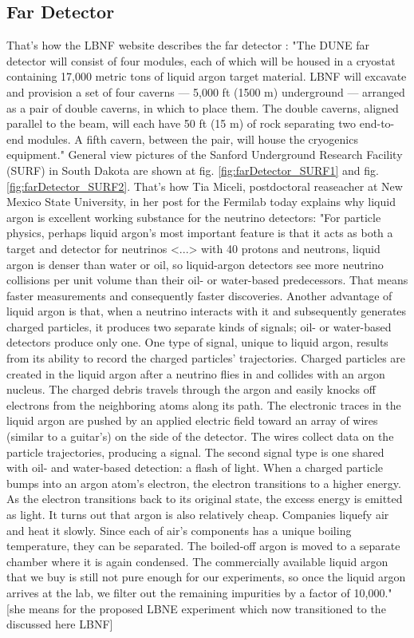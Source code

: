 \subsection{Far Detector}

That's how the LBNF website describes the far detector \cite{ref_LBNFweb}: "The DUNE far detector will consist of four modules, each of which will be housed in a cryostat containing 17,000 metric tons of liquid argon target material. LBNF will excavate and provision a set of four caverns — 5,000 ft (1500 m) underground — arranged as a pair of double caverns, in which to place them. The double caverns, aligned parallel to the beam, will each have 50 ft (15 m) of rock separating two end-to-end modules. A fifth cavern, between the pair, will house the cryogenics equipment." General view pictures of the Sanford Underground Research Facility (SURF) in South Dakota are shown at fig. \ref{fig:farDetector_SURF1} and fig. \ref{fig:farDetector_SURF2}.
That's how Tia Miceli, postdoctoral reaseacher at New Mexico State University, in her post for the Fermilab today \cite{ref_aboutLAr} explains why liquid argon is excellent working substance for the neutrino detectors:
"For particle physics, perhaps liquid argon's most important feature is that it acts as both a target and detector for neutrinos <...> with 40 protons and neutrons, liquid argon is denser than water or oil, so liquid-argon detectors see more neutrino collisions per unit volume than their oil- or water-based predecessors. That means faster measurements and consequently faster discoveries. Another advantage of liquid argon is that, when a neutrino interacts with it and subsequently generates charged particles, it produces two separate kinds of signals; oil- or water-based detectors produce only one. One type of signal, unique to liquid argon, results from its ability to record the charged particles' trajectories. Charged particles are created in the liquid argon after a neutrino flies in and collides with an argon nucleus. The charged debris travels through the argon and easily knocks off electrons from the neighboring atoms along its path. The electronic traces in the liquid argon are pushed by an applied electric field toward an array of wires (similar to a guitar's) on the side of the detector. The wires collect data on the particle trajectories, producing a signal. The second signal type is one shared with oil- and water-based detection: a flash of light. When a charged particle bumps into an argon atom's electron, the electron transitions to a higher energy. As the electron transitions back to its original state, the excess energy is emitted as light. 
It turns out that argon is also relatively cheap. Companies liquefy air and heat it slowly. Since each of air's components has a unique boiling temperature, they can be separated. The boiled-off argon is moved to a separate chamber where it is again condensed. The commercially available liquid argon that we buy is still not pure enough for our experiments, so once the liquid argon arrives at the lab, we filter out the remaining impurities by a factor of 10,000." [she means for the proposed LBNE experiment which now transitioned to the discussed here LBNF] 

